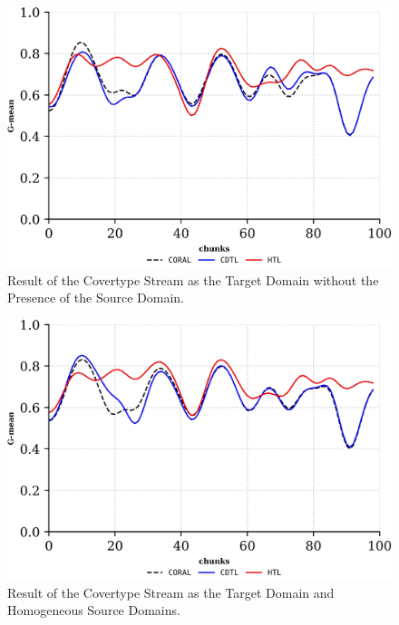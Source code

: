 \begin{figure}[!ht]
	\centering
	\includegraphics[width=1\linewidth]{6_transfer_learning/figures/exp1_0.png}
	\caption{Result of the Covertype Stream as the Target Domain without the Presence of the Source Domain.}
	\label{fig:6_exp1}
\end{figure}
\begin{figure}[!ht]
	\centering
	\includegraphics[width=1\linewidth]{6_transfer_learning/figures/exp1_1.png}
	\caption{Result of the Covertype Stream as the Target Domain and Homogeneous Source Domains.}
	\label{fig:6_exp2}
\end{figure}

